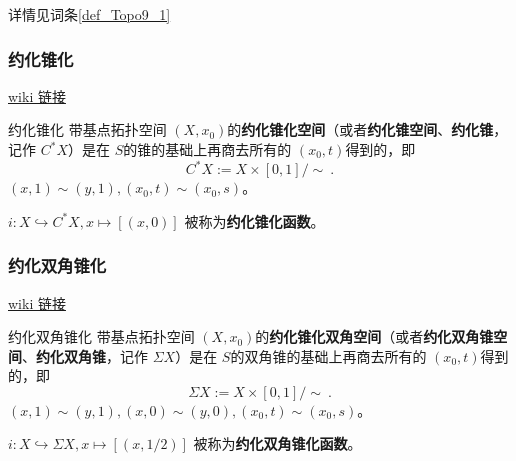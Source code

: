 详情见词条\autoref{def_Topo9_1}~


\subsubsection{约化锥化}

\href{https://en.wikipedia.org/wiki/Cone_(topology)\#Reduced_cone}{wiki 链接}

\begin{definition}{约化锥化}
带基点拓扑空间 $(X, x_0)$的\textbf{约化锥化空间}（或者\textbf{约化锥空间}、\textbf{约化锥}，记作 $C^* X$）是在 $S$的锥的基础上再商去所有的 $(x_0, t)$得到的，即
\[
    C^* X := X \times [0,1] / \sim~.
\]
$(x, 1) \sim (y, 1), (x_0, t) \sim (x_0, s)$。

$i: X \hookrightarrow C^* X, x \mapsto [(x, 0)]$ 被称为\textbf{约化锥化函数}。
\end{definition}

\subsubsection{约化双角锥化}

\href{https://en.wikipedia.org/wiki/Suspension_(topology)\#Reduced_suspension}{wiki 链接}

\begin{definition}{约化双角锥化}
带基点拓扑空间 $(X, x_0)$的\textbf{约化锥化双角空间}（或者\textbf{约化双角锥空间}、\textbf{约化双角锥}，记作 $\Sigma X$）是在 $S$的双角锥的基础上再商去所有的 $(x_0, t)$得到的，即
\[
    \Sigma X := X \times [0,1] / \sim~.
\]
$(x, 1) \sim (y, 1), (x, 0) \sim (y, 0), (x_0, t) \sim (x_0, s)$。

$i: X \hookrightarrow \Sigma X, x \mapsto [(x, 1/2)]$ 被称为\textbf{约化双角锥化函数}。
\end{definition}


